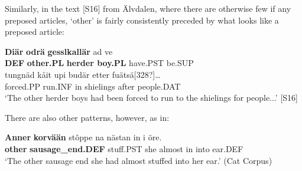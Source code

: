 Similarly, in the text [S16] from Älvdalen, where there are otherwise few if any preposed articles,  ‘other’ is fairly consistently preceded by what looks like a preposed article:


\ea\label{}
\gll \textbf{Diär} \textbf{odrä} \textbf{gesslkallär} ad  ve\\
\textbf{DEF} \textbf{other.PL} \textbf{herder boy.PL} have.PST  be.SUP\\
\gll tungnäd  kåit  upi  budär  etter  fuätsä[328?]…\\
forced.PP  run.INF  in  shielings  after  people.DAT\\
\glt ‘The other herder boys had been forced to run to the shielings for people...’ [S16]
\z

There are also other patterns, however, as in:


\ea\label{}
\gll \textbf{Anner}\textbf{  korvään} stôppe  na  nästan  in  i  öre.\\
\textbf{other} \textbf{sausage\_end.DEF} stuff.PST  she  almost  in  into  ear.DEF\\
\glt ‘The other sausage end she had almost stuffed into her ear.’ (Cat Corpus)
\z

